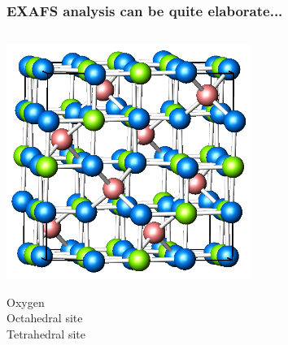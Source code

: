 \documentclass[10pt, xcolor=x11names, compress]{beamer}
\begin{document}
\begin{frame}
  \frametitle{EXAFS analysis can be quite elaborate...}
  \begin{columns}[T]
    \begin{column}{0.2\linewidth}
      \includegraphics[width=\linewidth]{images/ferrite.png}
      \begin{center}
        {\color{Blue3}Oxygen}\\{\color{Green3}Octahedral site}
        \\{\color{Red3}Tetrahedral site}
      \end{center}
    \end{column}
    \begin{column}{0.3\linewidth}

\end{column}
\end{columns}
\end{frame}
\end{document}
